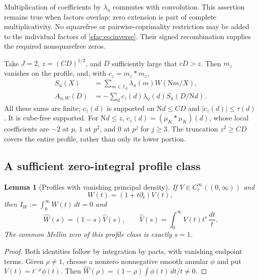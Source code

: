 \documentclass[11pt]{article}
\numberwithin{equation}{section}
\newtheorem{lemma}[theorem]{Lemma}
\theoremstyle{definition}
\theoremstyle{remark}
\newcommand{\N}{\mathrm N}
\newcommand{\good}{\mathcal I_S}
\begin{document}
Multiplication of coefficients by $\lambda_u$ commutes with convolution.
This assertion remains true when factors overlap: zero extension is part
of complete multiplicativity.  No squarefree or pairwise-coprimality
restriction may be added to the individual factors of
\eqref{sfac:eq:inverse}.  Their signed recombination supplies the
required nonsquarefree zeros.

Take $J=2$, $z=(CD)^{1/2}$, and $D$ sufficiently large that $cD>z$.
Then $m_z$ vanishes on the profile, and, with $c_z=m_z*m_z$,
\begin{align}
 S_u(X)&=\sum_{m\in\good}\lambda_u(m)W(\N m/X),\label{sfac:eq:S}\\
 A_{u,W}(D)&=-\sum_d c_z(d)\lambda_u(d)S_u(D/\N d).
 \label{sfac:eq:factor}
\end{align}
All these sums are finite; $c_z(d)$ is supported on $\N d\le CD$ and
$|c_z(d)|\le\tau(d)$.  It is cube-free supported.  For $\N d\le z$,
$c_z(d)=(\mu_K*\mu_K)(d)$, whose local coefficients are $-2$ at
$p$, $1$ at $p^2$, and $0$ at $p^j$ for $j\ge3$.
The truncation $z^2\ge CD$ covers the entire profile, rather than
only its lower portion.

\subsection{A sufficient zero-integral profile class}

\begin{lemma}[Profiles with vanishing principal density]
\label{sfac:lem:profiles}
If $V\in C_c^\infty((0,\infty))$ and
\begin{equation}
 W(t)=(1+t\partial_t)V(t),
 \label{sfac:eq:derivative-profile}
\end{equation}
then $I_W:=\int_0^\infty W(t)\,dt=0$ and
\begin{equation}
 \widehat W(s)=(1-s)\widehat V(s),\qquad
 \widehat V(s)=\int_0^\infty V(t)t^s\,\frac{dt}{t}.
 \label{sfac:eq:profile-Mellin}
\end{equation}
The common Mellin zero of this profile class is exactly $s=1$.
\end{lemma}

\begin{proof}
Both identities follow by integration by parts, with vanishing endpoint
terms.  Given $\rho\ne1$, choose a nonzero nonnegative smooth annular
$\phi$ and put $V(t)=t^{-\rho}\phi(t)$.  Then
$\widehat W(\rho)=(1-\rho)\int\phi(t)\,dt/t\ne0$.
\end{proof}
\end{document}
